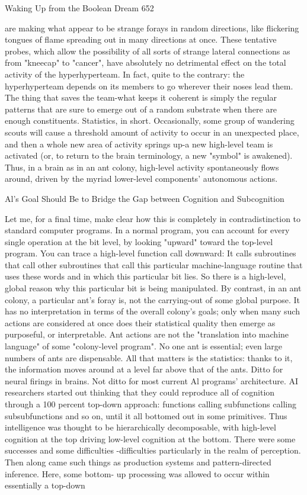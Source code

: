 Waking Up from the Boolean Dream                                                       652

are making what appear to be strange forays in random directions, like flickering
tongues of flame spreading out in many directions at once. These tentative probes,
which allow the possibility of all sorts of strange lateral connections as from
"kneecap" to "cancer", have absolutely no detrimental effect on the total activity of
the hyperhyperteam. In fact, quite to the contrary: the hyperhyperteam depends on its
members to go wherever their noses lead them. The thing that saves the team-what
keeps it coherent is simply the regular patterns that are sure to emerge out of a random
substrate when there are enough constituents. Statistics, in short.
        Occasionally, some group of wandering scouts will cause a threshold amount
of activity to occur in an unexpected place, and then a whole new area of activity
springs up-a new high-level team is activated (or, to return to the brain terminology, a
new "symbol" is awakened). Thus, in a brain as in an ant colony, high-level activity
spontaneously flows around, driven by the myriad lower-level components'
autonomous actions.

                         Al's Goal Should Be to Bridge the
                      Gap between Cognition and Subcognition

        Let me, for a final time, make clear how this is completely in contradistinction
to standard computer programs. In a normal program, you can account for every
single operation at the bit level, by looking "upward" toward the top-level program.
You can trace a high-level function call downward: It calls subroutines that call other
subroutines that call this particular machine-language routine that uses these words
and in which this particular bit lies. So there is a high-level, global reason why this
particular bit is being manipulated.
        By contrast, in an ant colony, a particular ant's foray is, not the carrying-out of
some global purpose. It has no interpretation in terms of the overall colony's goals;
only when many such actions are considered at once does their statistical quality then
emerge as purposeful, or interpretable. Ant actions are not the "translation into
machine language" of some "colony-level program". No one ant is essential; even
large numbers of ants are dispensable. All that matters is the statistics: thanks to it, the
information moves around at a level far above that of the ants. Ditto for neural firings
in brains. Not ditto for most current Al programs' architecture.
        AI researchers started out thinking that they could reproduce all of cognition
through a 100 percent top-down approach: functions calling subfunctions calling
subsubfunctions and so on, until it all bottomed out in some primitives. Thus
intelligence was thought to be hierarchically decomposable, with high-level cognition
at the top driving low-level cognition at the bottom. There were some successes and
some difficulties -difficulties particularly in the realm of perception. Then along came
such things as production systems and pattern-directed inference. Here, some bottom-
up processing was allowed to occur within essentially a top-down




